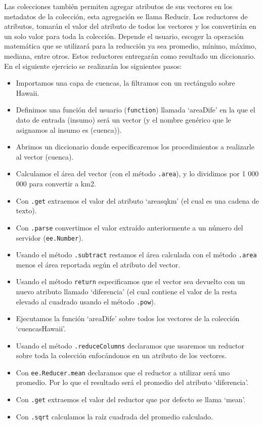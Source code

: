 \documentclass[
  12pt,
  letterpaper,
  twoside]{book}
\providecommand{\tightlist}{%
  \setlength{\itemsep}{0pt}\setlength{\parskip}{0pt}}
\begin{document}
Las colecciones también permiten agregar atributos de sus vectores en los metadatos de la colección, esta agregación se llama Reducir. Los reductores de atributos, tomarán el valor del atributo de todos los vectores y los convertirán en un solo valor para toda la colección. Depende el usuario, escoger la operación matemática que se utilizará para la reducción ya sea promedio, mínimo, máximo, mediana, entre otros. Estos reductores entregarán como resultado un diccionario. En el siguiente ejercicio se realizarán los siguientes pasos:

\begin{itemize}
\tightlist
\item
  Importamos una capa de cuencas, la filtramos con un rectángulo sobre Hawaii.
\item
  Definimos una función del usuario (\texttt{function}) llamada `areaDife' en la que el dato de entrada (insumo) será un vector (y el nombre genérico que le asignamos al insumo es (cuenca)).
\item
  Abrimos un diccionario donde especificaremos los procedimientos a realizarle al vector (cuenca).
\item
  Calculamos el área del vector (con el método \texttt{.area}), y lo dividimos por 1 000 000 para convertir a km2.
\item
  Con \texttt{.get} extraemos el valor del atributo `areasqkm' (el cual es una cadena de texto).
\item
  Con \texttt{.parse} convertimos el valor extraído anteriormente a un número del servidor (\texttt{ee.Number}).
\item
  Usando el método \texttt{.subtract} restamos el área calculada con el método \texttt{.area} menos el área reportada según el atributo del vector.
\item
  Usando el método \texttt{return} especificamos que el vector sea devuelto con un nuevo atributo llamado `diferencia' (el cual contiene el valor de la resta elevado al cuadrado usando el método \texttt{.pow}).
\item
  Ejecutamos la función `areaDife' sobre todos los vectores de la colección `cuencasHawaii'.
\item
  Usando el método \texttt{.reduceColumns} declaramos que usaremos un reductor sobre toda la colección enfocándonos en un atributo de los vectores.
\item
  Con \texttt{ee.Reducer.mean} declaramos que el reductor a utilizar será uno promedio. Por lo que el resultado será el promedio del atributo `diferencia'.
\item
  Con \texttt{.get} extraemos el valor del reductor que por defecto se llama `mean'.
\item
  Con \texttt{.sqrt} calculamos la raíz cuadrada del promedio calculado.
\end{itemize}
\end{document}

